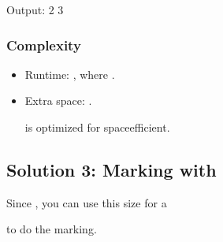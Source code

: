 \documentclass[letterpaper,12pt,english]{book}
\begin{document}
\begin{sphinxVerbatim}[commandchars=\\\{\}]
Output:
2
3
\end{sphinxVerbatim}


\subsubsection{Complexity}
\label{\detokenize{Sorting/04_SORT_287_Find_the_Duplicate_Number:id1}}\begin{itemize}
\item {} 
\sphinxAtStartPar
Runtime: , where .

\item {} 
\sphinxAtStartPar
Extra space: . %
\begin{footnote}[83]\sphinxAtStartFootnote
{}
%
\end{footnote} is optimized for space\sphinxhyphen{}efficient.

\end{itemize}


\subsection{Solution 3: Marking with }
\label{\detokenize{Sorting/04_SORT_287_Find_the_Duplicate_Number:solution-3-marking-with-std-bitset}}
\sphinxAtStartPar
Since , you can use this size for a %
\begin{footnote}[84]\sphinxAtStartFootnote
{}
%
\end{footnote} to do the marking.
\end{document}
